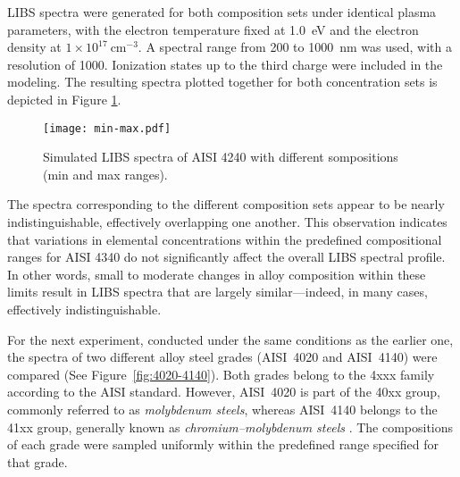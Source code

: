\documentclass[12pt,a4paper]{article}
\begin{document}
	
	LIBS spectra were generated for both composition sets under identical plasma parameters, with the electron temperature fixed at 1.0~eV and the electron density at $1 \times 10^{17}~\text{cm}^{-3}$. A spectral range from 200 to 1000~nm was used, with a resolution of 1000. Ionization states up to the third charge were included in the modeling. The resulting spectra plotted together for both concentration sets is depicted in Figure \ref{fig:min-max}.
	
	
	
	\begin{figure}[h!]
		\centering
		\texttt{[image: min-max.pdf]}
		\caption{Simulated LIBS spectra of AISI 4240 with different sompositions (min and max ranges).}
		\label{fig:min-max}
	\end{figure} 
	The spectra corresponding to the different composition sets appear to be nearly indistinguishable, effectively overlapping one another. This observation indicates that variations in elemental concentrations within the predefined compositional ranges for AISI 4340 do not significantly affect the overall LIBS spectral profile. In other words, small to moderate changes in alloy composition within these limits result in LIBS spectra that are largely similar—indeed, in many cases, effectively indistinguishable.
	
	
	
	For the next experiment, conducted under the same conditions as the earlier one, the spectra of two different alloy steel grades (AISI~4020 and AISI~4140) were compared (See Figure~\ref{fig:4020-4140}). Both grades belong to the 4xxx family according to the AISI standard. However, AISI~4020 is part of the 40xx group, commonly referred to as \emph{molybdenum steels}, whereas AISI~4140 belongs to the 41xx group, generally known as \emph{chromium--molybdenum steels} \cite{runsomSAEgrades}. The compositions of each grade were sampled uniformly within the predefined range specified for that grade.
	
\end{document}
